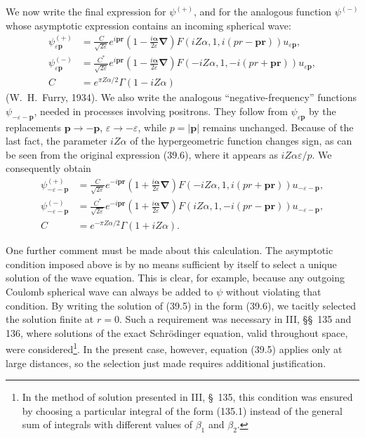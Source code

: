 We now write the final expression for $\psi^{(+)}$, and for the analogous function $\psi^{(-)}$ whose asymptotic expression contains an incoming spherical wave:
\begin{equation}
\begin{aligned}
\psi_{\varepsilon\mathbf p}^{(+)}
&=\frac C{\sqrt{2\varepsilon}}e^{i\mathbf p\mathbf r}
\left(1-\frac{i\boldsymbol\alpha}{2\varepsilon}\boldsymbol\nabla\right)
F(iZ\alpha,1,i(pr-\mathbf p\mathbf r))u_{\varepsilon\mathbf p},\\
\psi_{\varepsilon\mathbf p}^{(-)}
&=\frac{C^*}{\sqrt{2\varepsilon}}e^{i\mathbf p\mathbf r}
\left(1-\frac{i\boldsymbol\alpha}{2\varepsilon}\boldsymbol\nabla\right)
F(-iZ\alpha,1,-i(pr+\mathbf p\mathbf r))u_{\varepsilon\mathbf p},\\
C&=e^{\pi Z\alpha/2}\Gamma(1-iZ\alpha)
\end{aligned}
\tag{39.10}
\end{equation}
(W.~H.~Furry, 1934). We also write the analogous ``negative-frequency'' functions $\psi_{-\varepsilon-\mathbf p}$, needed in processes involving positrons. They follow from $\psi_{\varepsilon\mathbf p}$ by the replacements $\mathbf p\to-\mathbf p$, $\varepsilon\to-\varepsilon$, while $p=|\mathbf p|$ remains unchanged. Because of the last fact, the parameter $iZ\alpha$ of the hypergeometric function changes sign, as can be seen from the original expression (39.6), where it appears as $iZ\alpha\varepsilon/p$. We consequently obtain
\begin{equation}
\begin{aligned}
\psi_{-\varepsilon-\mathbf p}^{(+)}
&=\frac C{\sqrt{2\varepsilon}}e^{-i\mathbf p\mathbf r}
\left(1+\frac{i\boldsymbol\alpha}{2\varepsilon}\boldsymbol\nabla\right)
F(-iZ\alpha,1,i(pr+\mathbf p\mathbf r))u_{-\varepsilon-\mathbf p},\\
\psi_{-\varepsilon-\mathbf p}^{(-)}
&=\frac{C^*}{\sqrt{2\varepsilon}}e^{-i\mathbf p\mathbf r}
\left(1+\frac{i\boldsymbol\alpha}{2\varepsilon}\boldsymbol\nabla\right)
F(iZ\alpha,1,-i(pr-\mathbf p\mathbf r))u_{-\varepsilon-\mathbf p},\\
C&=e^{-\pi Z\alpha/2}\Gamma(1+iZ\alpha).
\end{aligned}
\tag{39.11}
\end{equation}

One further comment must be made about this calculation. The asymptotic condition imposed above is by no means sufficient by itself to select a unique solution of the wave equation. This is clear, for example, because any outgoing Coulomb spherical wave can always be added to $\psi$ without violating that condition. By writing the solution of (39.5) in the form (39.6), we tacitly selected the solution finite at $r=0$. Such a requirement was necessary in III, \S\S~135 and 136, where solutions of the exact Schrödinger equation, valid throughout space, were considered\footnote{In the method of solution presented in III, \S~135, this condition was ensured by choosing a particular integral of the form (135.1) instead of the general sum of integrals with different values of $\beta_1$ and $\beta_2$.}. In the present case, however, equation (39.5) applies only at large distances, so the selection just made requires additional justification.

